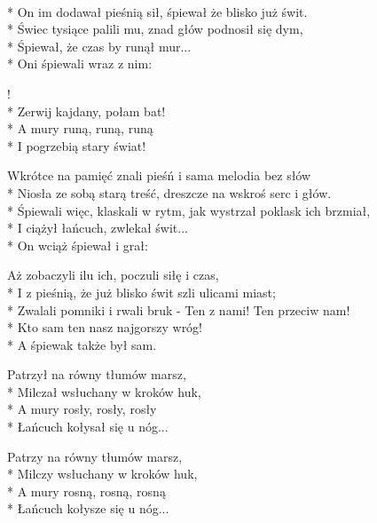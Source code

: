 
\begin{lyrics}[longestline={Śpiewali więc, klaskali w rytm, jak wystrzał poklask ich brzmiał,}]

\\*
On im dodawał pieśnią sił, śpiewał że blisko już świt.\\*
Świec tysiące palili mu, znad głów podnosił się dym,\\*
Śpiewał, że czas by runął mur...\\*
Oni śpiewali wraz z nim:

\begin{chorus}
!\\*
Zerwij kajdany, połam bat!\\*
A mury runą, runą, runą\\*
I pogrzebią stary świat!
\end{chorus}

Wkrótce na pamięć znali pieśń i sama melodia bez słów\\*
Niosła ze sobą starą treść, dreszcze na wskroś serc i głów.\\*
Śpiewali więc, klaskali w rytm, jak wystrzał poklask ich brzmiał,\\*
I ciążył łańcuch, zwlekał świt...\\*
On wciąż śpiewał i grał:

\chorusref

Aż zobaczyli ilu ich, poczuli siłę i czas,\\*
I z pieśnią, że już blisko świt szli ulicami miast;\\*
Zwalali pomniki i rwali bruk - Ten z nami! Ten przeciw nam!\\*
Kto sam ten nasz najgorszy wróg!\\*
A śpiewak także był sam.

Patrzył na równy tłumów marsz,\\*
Milczał wsłuchany w kroków huk,\\*
A mury rosły, rosły, rosły\\*
Łańcuch kołysał się u nóg...

Patrzy na równy tłumów marsz,\\*
Milczy wsłuchany w kroków huk,\\*
A mury rosną, rosną, rosną\\*
Łańcuch kołysze się u nóg...
\end{lyrics}



